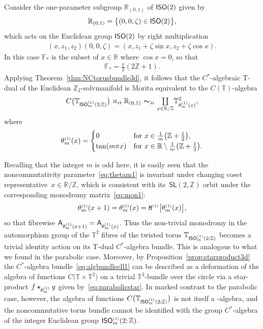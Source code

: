 \documentclass[10pt,a4paper]{amsart}
\numberwithin{equation}{section}
\newcommand{\Z}{\zed}
\newcommand{\F}{\mathbb{F}}
\newcommand{\mbf}[1]{{\boldsymbol {#1} }}
\def\A{{\sf A}}
\newcommand{\sfSL}{\mathsf{SL}}
\newcommand{\ISO}{{\sf ISO}}
\newcommand{\rt}{{\rm rt}}
\newcommand{\mcoprod}{\mbox{$\coprod\limits_{x\in\R/\Z}$}}
\newcommand{\R}{\real}
\newcommand{\zed}{{\mathbb Z}} %
\newcommand{\real}{{\mathbb R}} %
\newcommand{\torus}{{\mathbb T}} %
\begin{document}
Consider the one-parameter subgroup $\real_{(0,1)}$ of $\ISO(2)$
given by
\[
\real_{(0,1)} = \big\{(0,0,\zeta) \in \ISO(2)\big\} ,
\]
which acts on the Euclidean group $\ISO(2)$ by
right multiplication
\begin{gather*}%
(x,z_1,z_2) (0,0,\zeta) = (x,z_1+\zeta \sin x , z_2 + \zeta \cos x) .
\end{gather*}
In this case $\F_*$ is the subset of $x\in\R$ where $\cos x=0$, so that
\begin{gather}\label{eq:F*ell}
\F_* = \tfrac\pi2 (2 \Z+1) .
\end{gather}
Applying Theorem~\ref{thm:NCtorusbundle3d}, it follows that the $C^*$-algebraic T-dual of the
Euclidean $\Z_2$-solvmanifold is Morita equivalent to the
$C(\torus)$-algebra
\begin{gather}\label{eq:algbundleell1}
C\big(\torus_{\ISO^{\text{\tiny($1$)}}_m(2;\Z)}\big)\rtimes_\rt\real_{(0,1)}
\ \mbf\sim_{\text{\tiny M}} \ \mcoprod
\torus^2_{\theta^{\text{\tiny(1)}}_m(x)} ,
\end{gather}
where
\begin{gather}\label{eq:thetam1}
\theta_m^{\text{\tiny(1)}}(x) =
 \begin{cases}
 0 & \mbox{for} \ x \in \frac1{m} \big(\Z+\frac12\big) , \\
 \tan(m \pi x)
 & \mbox{for} \ x\in\R\setminus \frac1{m} \big(\Z+\frac12\big) . \end{cases}
\end{gather}

Recalling that the integer $m$ is odd here, it is easily seen that the noncommutativity para\-me\-ter~\eqref{eq:thetam1} is invariant under changing coset representative~$x\in\R/\Z$, which is consistent with its~$\sfSL(2,\Z)$ orbit under
the corresponding monodromy matrix~\eqref{eq:mon1}:
\[
\theta_m^{\text{\tiny(1)}}(x+1) = \theta_m^{\text{\tiny(1)}}(x) =
{\tt M}^{\text{\tiny(1)}}\big[\theta_m^{\text{\tiny(1)}}(x)\big],
\]
so that fibrewise $\A_{\theta^{\text{\tiny(1)}}_m(x+1)} =
\A_{\theta^{\text{\tiny(1)}}_m(x)}$. Thus the non-trivial
monodromy in the automorphism group of the $\torus^2$ fibres of the
twisted torus $\torus_{\ISO_m^{\text{\tiny(1)}}(2;\Z)}$ becomes a
trivial identity action on its T-dual $C^*$-algebra bundle.
This is analogous to what we found in the parabolic case. Moreover,
by Proposition~\ref{prop:starproduct3d} the $C^*$-algebra
bundle~\eqref{eq:algbundleell1} can be described as a deformation of the algebra of functions
$C\big(\torus\times\torus^2\big)$ on a trivial $\torus^2$-bundle over the
circle via a star-product
$f\star_{\theta_m^{\text{\tiny(1)}}}g$ given by~\eqref{eq:parabolicstar}. In marked contrast to the parabolic case, however, the algebra of
functions $C\big(\torus_{\ISO_m^{\text{\tiny(1)}}(2;\Z)}\big)$ is not itself
a \smash{$C\big(\torus^2\big)$}-algebra, and the
noncommutative torus bundle cannot be identified with the group
$C^*$-algebra of the integer Euclidean group
$\ISO_m^{\text{\tiny(1)}}(2;\Z)$.
\end{document}
